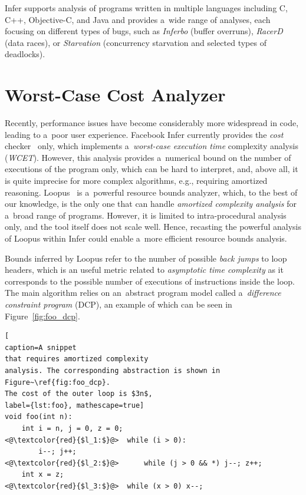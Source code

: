 \documentclass{ExcelAtFIT}
\begin{document}
Infer supports analysis of programs written in multiple
languages including C, C++, Objective-C, and Java and provides
a~wide range of analyses, each focusing on different types of bugs,
such as \textit{Inferbo} (buffer overruns),
\textit{RacerD}~\cite{racerd} (data races),
or \textit{Starvation} (concurrency starvation and
selected types of deadlocks).

\section{Worst-Case Cost Analyzer}
\label{sec:worst-case-analyzer}

Recently, performance issues have become
considerably more widespread in code, leading
to a~poor user experience.
Facebook Infer
currently provides the \emph{cost}
checker~\cite{cost-checker} only, which implements
a~\emph{worst-case execution time}
complexity analysis (\emph{WCET}). However, this
analysis provides a~numerical bound
on the number of executions of the program
only, which can be hard to interpret, and,
above all, it is quite imprecise for more complex
algorithms, e.g., requiring amortized reasoning.
Loopus~\cite{loopus-tool} is a~powerful resource
bounds analyzer, which, to the best of our knowledge,
is the only one that can handle
\emph{amortized complexity analysis} for a~broad
range of programs. However, it is limited to
intra-procedural analysis only, and the tool itself
does not scale well. Hence, recasting
the powerful analysis of Loopus within Infer
could enable a~more efficient resource bounds
analysis.

Bounds inferred by Loopus refer to the number
of possible \textit{back jumps} to loop headers, which
is an useful metric related to
\textit{asymptotic time complexity} as it corresponds
to the possible number of executions of instructions
inside the loop. The main algorithm relies on
an~abstract program model called
a~\textit{difference constraint program} (DCP), an example
of which can be seen in Figure~\ref{fig:foo_dcp}.
\vspace{-1mm}
\begin{lstlisting}[
caption=A snippet
that requires amortized complexity
analysis. The corresponding abstraction is shown in
Figure~\ref{fig:foo_dcp}.
The cost of the outer loop is $3n$,
label={lst:foo}, mathescape=true]
void foo(int n):
    int i = n, j = 0, z = 0;
<@\textcolor{red}{$l_1:$}@>  while (i > 0):
        i--; j++;
<@\textcolor{red}{$l_2:$}@>      while (j > 0 && *) j--; z++;
    int x = z;
<@\textcolor{red}{$l_3:$}@>  while (x > 0) x--;
\end{lstlisting}
\end{document}
